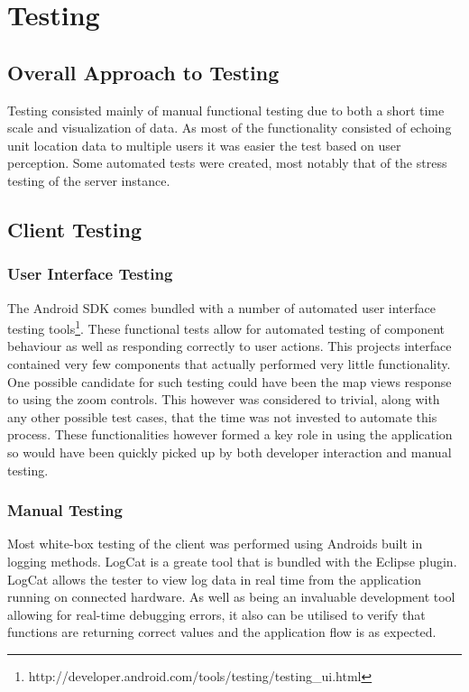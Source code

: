 \chapter{Testing}
\section{Overall Approach to Testing}
Testing consisted mainly of manual functional testing due to both a short time scale and visualization of data. As most of the functionality consisted of echoing unit location data to multiple users it was easier the test based on user perception. Some automated tests were created, most notably that of the stress testing of the server instance. 

\section{Client Testing}
\subsection{User Interface Testing}
The Android SDK comes bundled with a number of automated user interface testing tools\footnote{http://developer.android.com/tools/testing/testing\_ui.html}. These functional tests allow for automated testing of component behaviour as well as responding correctly to user actions. This projects interface contained very few components that actually performed very little functionality. One possible candidate for such testing could have been the map views response to using the zoom controls. This however was considered to trivial, along with any other possible test cases, that the time was not invested to automate this process. These functionalities however formed a key role in using the application so would have been quickly picked up by both developer interaction and manual testing.

\subsection{Manual Testing}
Most white-box testing of the client was performed using Androids built in logging methods. LogCat is a greate tool that is bundled with the Eclipse plugin. LogCat allows the tester to view log data in real time from the application running on connected hardware. As well as being an invaluable development tool allowing for real-time debugging errors, it also can be utilised to verify that functions are returning correct values and the application flow is as expected.

